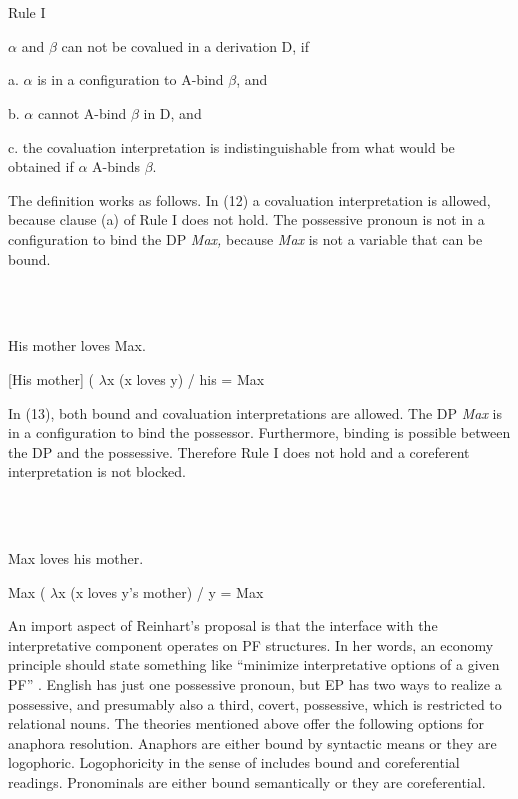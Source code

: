 \documentclass[output=paper]{langsci/langscibook}
\begin{document}
\ea%
    \label{ex:key:11}
    \gll\\
        \\
    \glt
    \z

          Rule I \citep[185]{Reinhart2006}

$\alpha $ and $\beta $ can not be covalued in a derivation D, if

a.   $\alpha $ is in a configuration to A-bind $\beta $, and

b.   $\alpha $ cannot A-bind $\beta $ in D, and

c.   the covaluation interpretation is indistinguishable from what would be obtained if $\alpha $ A-binds $\beta $.

The definition works as follows. In (12) a covaluation interpretation is allowed, because clause (a) of Rule I does not hold. The possessive pronoun is not in a configuration to bind the DP \textit{Max,} because \textit{Max} is not a variable that can be bound.

\ea%
    \label{ex:key:12}
    \gll\\
        \\
    \glt
    \z

          \citet[186]{Reinhart2006}

His mother loves Max.

[His mother] ( $\lambda $x (x loves y) / his = Max

In (13), both bound and covaluation interpretations are allowed. The DP \textit{Max} is in a configuration to bind the possessor. Furthermore, binding is possible between the DP and the possessive. Therefore Rule I does not hold and a coreferent interpretation is not blocked.

\ea%
    \label{ex:key:13}
    \gll\\
        \\
    \glt
    \z

          \citet[186]{Reinhart2006}

Max loves his mother.

Max ( $\lambda $x (x loves y’s mother) / y = Max

An import aspect of Reinhart’s proposal is that the interface with the interpretative component operates on PF structures. In her words, an economy principle should state something like “minimize interpretative options of a given PF” \citep[103]{Reinhart2006}. English has just one possessive pronoun, but EP has two ways to realize a possessive, and presumably also a third, covert, possessive, which is restricted to relational nouns. The theories mentioned above offer the following options for anaphora resolution. Anaphors are either bound by syntactic means or they are logophoric. Logophoricity in the sense of \citet{Reuland2011} includes bound and coreferential readings. Pronominals are either bound semantically or they are coreferential.
\end{document}
